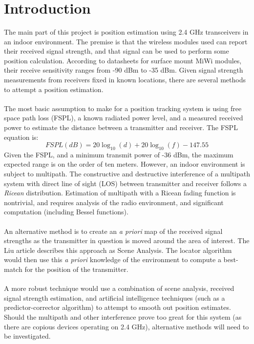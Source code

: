 \documentclass{article}
\begin{document}
\section*{Introduction}
\paragraph*{}
The main part of this project is position estimation using 2.4 GHz transceivers in an indoor environment.  The premise is that the wireless modules used can report their received signal strength, and that signal can be used to perform some position calculation.  According to datasheets for surface mount MiWi modules, their receive sensitivity ranges from -90 dBm to -35 dBm.  Given signal strength measurements from receivers fixed in known locations, there are several methods to attempt a position estimation.
\paragraph*{}
The most basic assumption to make for a position tracking system is using free space path loss (FSPL), a known radiated power level, and a measured received power to estimate the distance between a transmitter and receiver.  The FSPL equation is:
\begin{equation}
FSPL(dB) = 20\log_{10}(d) + 20\log_{10}(f) - 147.55
\end{equation}
Given the FSPL, and a minimum transmit power of -36 dBm, the maximum expected range is on the order of ten meters.  However, an indoor environment is subject to multipath.  The constructive and destructive interference of a multipath system with direct line of sight (LOS) between transmitter and receiver follows a \textit{Ricean} distribution.  Estimation of multipath with a Ricean fading function is nontrivial, and requires analysis of the radio environment, and significant computation (including Bessel functions).
\paragraph*{}
An alternative method is to create an \textit{a priori} map of the received signal strengths as the transmitter in question is moved around the area of interest.  The Liu article describes this approach as Scene Analysis.  The locator algorithm would then use this \textit{a priori} knowledge of the environment to compute a best-match for the position of the transmitter.
\paragraph*{}
A more robust technique would use a combination of scene analysis, received signal strength estimation, and artificial intelligence techniques (such as a predictor-corrector algorithm) to attempt to smooth out position estimates.  Should the multipath and other interference prove too great for this system (as there are copious devices operating on 2.4 GHz), alternative methods will need to be investigated.

\nocite{*}
{}

\end{document}
